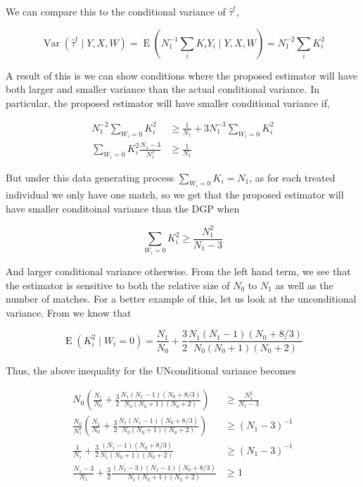 \documentclass{article}
\DeclareMathOperator{\E}{E}
\DeclareMathOperator{\Var}{Var}
\newcommand{\hta}{\hat \tau^{t}}
\begin{document}
 We can compare this to the conditional variance of $\hta$,

$$\Var(\hta \mid Y,X,W) = \E(N_{1}^{-1}\sum_{i}K_{i}Y_{i} \mid Y,X,W) = N_{1}^{-2}\sum_{i}K_{i}^{2}$$

A result of this is we can show conditions where the proposed estimator will have both larger and smaller variance than the actual conditional variance. In particular, the proposed estimator will have smaller conditional variance if,

\begin{align*} N_{1}^{-2}\sum_{W_{i}=0}K_{i}^{2} &\geq \frac{1}{N_{1}}+3N_{1}^{-3}\sum_{W_{i}=0}K_{i}^{2} \\
\sum_{W_{i}=0}K_{i}^{2}\frac{N_{1}-3}{N_{1}^{3}} &\geq \frac{1}{N_{1}}
\end{align*}

But under this data generating process $\sum_{W_{i}=0}K_{i} = N_{1}$, as for each treated individual we only have one match, so we get that the proposed estimator will have smaller conditoinal variance than the DGP when

$$\sum_{W_{i}=0}K_{i}^{2} \geq \frac{N_{1}^{2}}{N_{1}-3}$$

And larger conditional variance otherwise. From the left hand term, we see that the estimator is sensitive to both the relative size of $N_{0}$ to $N_{1}$ as well as the number of matches. For a better example of this, let us look at the unconditional variance. From \cite{AnI:08} we know that

$$\E(K_{i}^{2} \mid W_{i}=0) = \frac{N_{1}}{N_{0}}+\frac{3}{2}\frac{N_{1}(N_{1}-1)(N_{0}+8/3)}{N_{0}(N_{0}+1)(N_{0}+2)}$$

Thus, the above inequality for the UNconditional variance becomes

\begin{align*} N_{0}\left(\frac{N_{1}}{N_{0}}+\frac{3}{2}\frac{N_{1}(N_{1}-1)(N_{0}+8/3)}{N_{0}(N_{0}+1)(N_{0}+2)}\right) &\geq \frac{N_{1}^{2}}{N_{1}-3} \\
\frac{N_{0}}{N_{1}^{2}}\left(\frac{N_{1}}{N_{0}}+\frac{3}{2}\frac{N_{1}(N_{1}-1)(N_{0}+8/3)}{N_{0}(N_{0}+1)(N_{0}+2)}\right) &\geq (N_{1}-3)^{-1} \\
\frac{1}{N_{1}}+\frac{3}{2}\frac{(N_{1}-1)(N_{0}+8/3)}{N_{1}(N_{0}+1)(N_{0}+2)} &\geq (N_{1}-3)^{-1} \\
\frac{N_{1}-3}{N_{1}}+\frac{3}{2}\frac{(N_{1}-3)(N_{1}-1)(N_{0}+8/3)}{N_{1}(N_{0}+1)(N_{0}+2)} &\geq 1
\end{align*}
\end{document}

